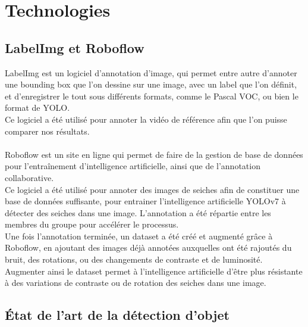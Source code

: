 \pagestyle{plain}
\chapter{Technologies}

\section{LabelImg et Roboflow}
LabelImg est un logiciel d'annotation d'image, qui permet entre autre d'annoter une bounding box que l'on dessine sur une image, avec un label que l'on définit, et d'enregistrer le tout sous différents formats, comme le Pascal VOC, ou bien le format de YOLO.\\
Ce logiciel a été utilisé pour annoter la vidéo de référence afin que l'on puisse comparer nos résultats.\\
\\
Roboflow est un site en ligne qui permet de faire de la gestion de base de données pour l'entraînement d'intelligence artificielle, ainsi que de l'annotation collaborative.\\
Ce logiciel a été utilisé pour annoter des images de seiches afin de constituer une base de données suffisante, pour entrainer l'intelligence artificielle YOLOv7\cite{wang_yolov7_nodate} à détecter des seiches dans une image. L'annotation a été répartie entre les membres du groupe pour accélérer le processus.\\
Une fois l'annotation terminée, un dataset a été créé et augmenté grâce à Roboflow, en ajoutant des images déjà annotées auxquelles ont été rajoutés du bruit, des rotations, ou des changements de contraste et de luminosité. Augmenter ainsi le dataset permet à l'intelligence artificielle d'être plus résistante à des variations de contraste ou de rotation des seiches dans une image.\\




\section{État de l'art de la détection d'objet}

